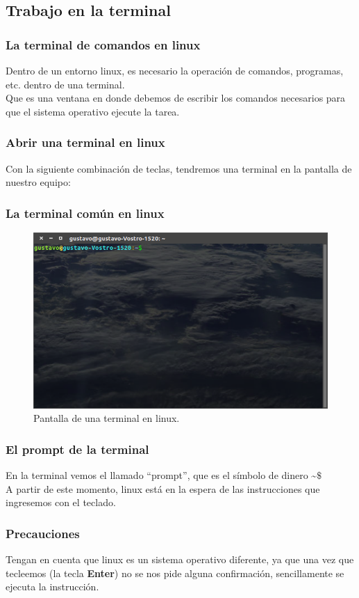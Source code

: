 \subsection{Trabajo en la terminal}
\begin{frame}
\frametitle{La terminal de comandos en linux}
Dentro de un entorno linux, es necesario la operación de comandos, programas, etc. dentro de una terminal.
\\
\bigskip
Que es una ventana en donde debemos de escribir los comandos necesarios para que el sistema operativo ejecute la tarea.
\end{frame}
\begin{frame}
\frametitle{Abrir una terminal en linux}
Con la siguiente combinación de teclas, tendremos una terminal en la pantalla de nuestro equipo:
\\
\bigskip
\bigskip
\begin{center}
\end{center}
\end{frame}
\begin{frame}
\frametitle{La terminal común en linux}
\begin{figure}
	\centering
	\includegraphics[scale=0.25]{Terminal_01}
	\caption{Pantalla de una terminal en linux.}
\end{figure}
\end{frame}
\begin{frame}
\frametitle{El prompt de la terminal}
En la terminal vemos el llamado \enquote{prompt}, que es el símbolo de dinero  \textasciitilde $\$$
\\
\bigskip
A partir de este momento, linux está en la espera de las instrucciones que ingresemos con el teclado.
\end{frame}
\begin{frame}
\frametitle{Precauciones}
Tengan en cuenta que linux es un sistema operativo diferente, ya que una vez que tecleemos \keys{\return} (la tecla \textbf{Enter}) no se nos pide alguna confirmación, sencillamente se ejecuta la instrucción.
\end{frame}
